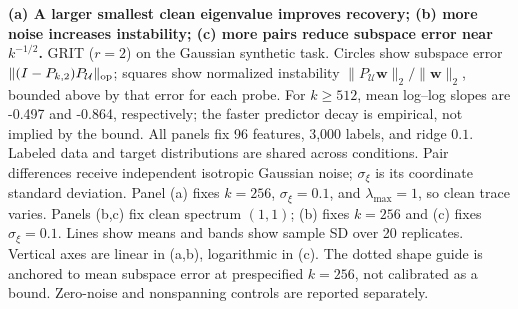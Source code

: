 \textbf{(a) A larger smallest clean eigenvalue improves recovery; (b) more noise increases instability; (c) more pairs reduce subspace error near $k^{-1/2}$.} GRIT ($r=2$) on the Gaussian synthetic task. Circles show subspace error $\|(I-P_{k,2})P_{\mathcal U}\|_{\rm op}$; squares show normalized instability $\|P_{\mathcal U}\boldsymbol w\|_2/\|\boldsymbol w\|_2$, bounded above by that error for each probe. For $k\ge512$, mean log--log slopes are -0.497 and -0.864, respectively; the faster predictor decay is empirical, not implied by the bound. All panels fix 96 features, 3,000 labels, and ridge $0.1$. Labeled data and target distributions are shared across conditions. Pair differences receive independent isotropic Gaussian noise; $\sigma_\xi$ is its coordinate standard deviation. Panel (a) fixes $k=256$, $\sigma_\xi=0.1$, and $\lambda_{\max}=1$, so clean trace varies. Panels (b,c) fix clean spectrum $(1,1)$; (b) fixes $k=256$ and (c) fixes $\sigma_\xi=0.1$. Lines show means and bands show sample SD over 20 replicates. Vertical axes are linear in (a,b), logarithmic in (c). The dotted shape guide is anchored to mean subspace error at prespecified $k=256$, not calibrated as a bound. Zero-noise and nonspanning controls are reported separately. 
